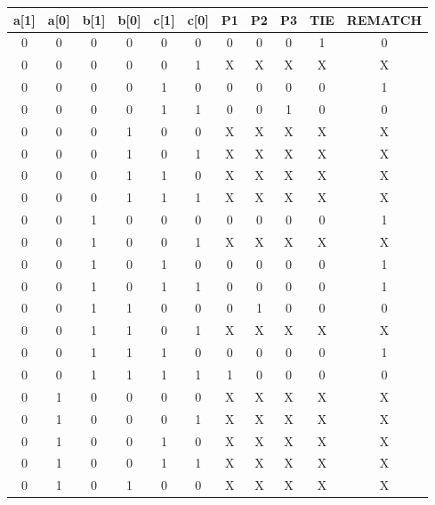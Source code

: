 \documentclass{article}
\begin{document}
\begin{center}
    \renewcommand{\arraystretch}{.95}
    \begin{tabular}{c|c|c|c|c|c|c|c|c|c|c}
        a[1] & a[0] & b[1] & b[0] & c[1] & c[0] & P1 & P2 &  P3 & TIE & REMATCH \\
        \hline
        0  &  0  &  0  &  0  &  0  &  0  &  0  &  0  &  0  &  1  &  0 \\
        0  &  0  &  0  &  0  &  0  &  1  &  X  &  X  &  X  &  X  &  X \\
        0  &  0  &  0  &  0  &  1  &  0  &  0  &  0  &  0  &  0  &  1 \\
        0  &  0  &  0  &  0  &  1  &  1  &  0  &  0  &  1  &  0  &  0 \\
        0  &  0  &  0  &  1  &  0  &  0  &  X  &  X  &  X  &  X  &  X \\
        0  &  0  &  0  &  1  &  0  &  1  &  X  &  X  &  X  &  X  &  X \\
        0  &  0  &  0  &  1  &  1  &  0  &  X  &  X  &  X  &  X  &  X \\
        0  &  0  &  0  &  1  &  1  &  1  &  X  &  X  &  X  &  X  &  X \\
        0  &  0  &  1  &  0  &  0  &  0  &  0  &  0  &  0  &  0  &  1 \\
        0  &  0  &  1  &  0  &  0  &  1  &  X  &  X  &  X  &  X  &  X \\
        0  &  0  &  1  &  0  &  1  &  0  &  0  &  0  &  0  &  0  &  1 \\
        0  &  0  &  1  &  0  &  1  &  1  &  0  &  0  &  0  &  0  &  1 \\
        0  &  0  &  1  &  1  &  0  &  0  &  0  &  1  &  0  &  0  &  0 \\
        0  &  0  &  1  &  1  &  0  &  1  &  X  &  X  &  X  &  X  &  X \\
        0  &  0  &  1  &  1  &  1  &  0  &  0  &  0  &  0  &  0  &  1 \\
        0  &  0  &  1  &  1  &  1  &  1  &  1  &  0  &  0  &  0  &  0 \\
        0  &  1  &  0  &  0  &  0  &  0  &  X  &  X  &  X  &  X  &  X \\
        0  &  1  &  0  &  0  &  0  &  1  &  X  &  X  &  X  &  X  &  X \\
        0  &  1  &  0  &  0  &  1  &  0  &  X  &  X  &  X  &  X  &  X \\
        0  &  1  &  0  &  0  &  1  &  1  &  X  &  X  &  X  &  X  &  X \\
        0  &  1  &  0  &  1  &  0  &  0  &  X  &  X  &  X  &  X  &  X \\

\end{tabular}
\end{center}
\end{document}
